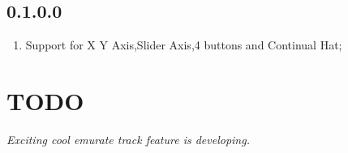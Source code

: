 \documentclass[12pt,a4paper]{article}
\begin{document}
\begin{CJK}{UTF8}{gbsn}
\subsection{0.1.0.0}
\begin{enumerate}
	\item Support for X Y Axis,Slider Axis,4 buttons and Continual Hat;
\end{enumerate}
\section{TODO}
\emph{Exciting cool emurate track feature is developing.}
\end{CJK}
\end{document}

